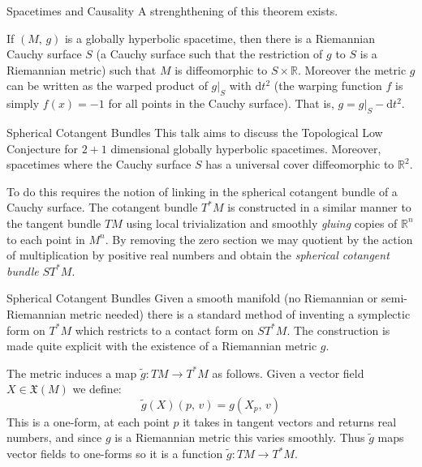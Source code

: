 \documentclass{beamer}
\begin{document}
    \begin{frame}{Spacetimes and Causality}
        A strenghthening of this theorem exists.
        \begin{theorem}
            If $(M,\,g)$ is a globally hyperbolic spacetime, then there is a
            Riemannian Cauchy surface $S$ (a Cauchy surface such that the
            restriction of $g$ to $S$ is a Riemannian metric) such that
            $M$ is diffeomorphic to $S\times\mathbb{R}$. Moreover the metric
            $g$ can be written as the warped product of $g|_{S}$ with
            $\textrm{d}t^{2}$ (the warping function $f$ is simply
            $f(x)=-1$ for all points in the Cauchy surface). That is,
            $g=g|_{S}-\textrm{d}t^{2}$.
        \end{theorem}
    \end{frame}
    \begin{frame}{Spherical Cotangent Bundles}
        This talk aims to discuss the Topological Low Conjecture
        for $2+1$ dimensional globally hyperbolic spacetimes. Moreover,
        spacetimes where the Cauchy surface $S$ has a universal cover
        diffeomorphic to $\mathbb{R}^{2}$.
        \par\hfill\par
        To do this requires the notion of linking in the spherical cotangent
        bundle of a Cauchy surface. The cotangent bundle $T^{*}M$ is
        constructed in a similar manner to the tangent bundle $TM$ using
        local trivialization and smoothly \textit{gluing} copies of
        $\mathbb{R}^{n}$ to each point in $M^{n}$. By removing the zero section
        we may quotient by the action of multiplication by positive real numbers
        and obtain the \textit{spherical cotangent bundle}
        $ST^{*}M$.
    \end{frame}
    \begin{frame}{Spherical Cotangent Bundles}
        Given a smooth manifold (no Riemannian or semi-Riemannian metric needed)
        there is a standard method of inventing a symplectic form on
        $T^{*}M$ which restricts to a contact form on $ST^{*}M$. The
        construction is made quite explicit with the existence of a
        Riemannian metric $g$.
        \par\hfill\par
        The metric induces a map $\tilde{g}:TM\rightarrow{T}^{*}M$ as follows.
        Given a vector field $X\in\mathfrak{X}(M)$ we define:
        \begin{equation}
            \tilde{g}(X)(p,\,v)=g(X_{p},\,v)
        \end{equation}
        This is a one-form, at each point $p$ it takes in tangent vectors and
        returns real numbers, and since $g$ is a Riemannian metric this varies
        smoothly. Thus $\tilde{g}$ maps vector fields to one-forms so it is
        a function $\tilde{g}:TM\rightarrow{T}^{*}M$.
    \end{frame}
\end{document}
